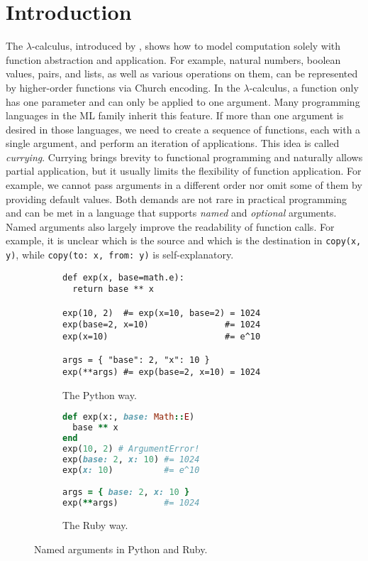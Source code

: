 \section{Introduction}

The $\lambda$-calculus, introduced by \citet{church1941calculi}, shows how to
model computation solely with function abstraction and application. For example,
natural numbers, boolean values, pairs, and lists, as well as various operations
on them, can be represented by higher-order functions via Church encoding. In
the $\lambda$-calculus, a function only has one parameter and can only be
applied to one argument. Many programming languages in the ML family inherit
this feature. If more than one argument is desired in those languages, we need
to create a sequence of functions, each with a single argument, and perform an
iteration of applications. This idea is called \emph{currying}. Currying brings
brevity to functional programming and naturally allows partial application, but
it usually limits the flexibility of function application. For example, we
cannot pass arguments in a different order nor omit some of them by providing
default values. Both demands are not rare in practical programming and can be
met in a language that supports \emph{named} and \emph{optional} arguments.
Named arguments also largely improve the readability of function calls. For
example, it is unclear which is the source and which is the destination in
\lstinline{copy(x, y)}, while \lstinline{copy(to: x, from: y)} is
self-explanatory.

\begin{figure}
\begin{subfigure}{0.5\textwidth}
\begin{lstlisting}[language={[3]Python}]
def exp(x, base=math.e):
  return base ** x

exp(10, 2)  #= exp(x=10, base=2) = 1024
exp(base=2, x=10)               #= 1024
exp(x=10)                       #= e^10

args = { "base": 2, "x": 10 }
exp(**args) #= exp(base=2, x=10) = 1024
\end{lstlisting}
\caption{The Python way.} \label{fig:python}
\end{subfigure}
\hfill
\begin{subfigure}{0.35\textwidth}
\begin{lstlisting}[language=Ruby]
def exp(x:, base: Math::E)
  base ** x
end
exp(10, 2) # ArgumentError!
exp(base: 2, x: 10) #= 1024
exp(x: 10)          #= e^10

args = { base: 2, x: 10 }
exp(**args)         #= 1024
\end{lstlisting}
\caption{The Ruby way.} \label{fig:ruby}
\end{subfigure}
\caption{Named arguments in Python and Ruby.} \label{fig:python-ruby}
\end{figure}

